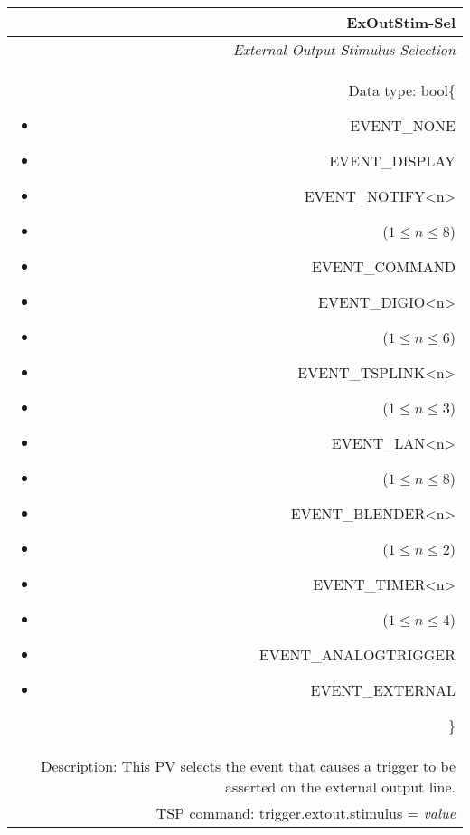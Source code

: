 \documentclass[openany]{article}
\begin{document}
		\begin{tabular}{N}
			\hline
			\bfseries ExOutStim-Sel\label{pv:exoutstim-sel} \\ \hline
			\emph{External Output Stimulus Selection} \\
			Data type: bool\{\begin{itemize}[noitemsep]
				\small
				\item[] EVENT\_NONE
				\item[] EVENT\_DISPLAY
				\item[] EVENT\_NOTIFY\textless n\textgreater
				\item[] ($1\leq n\leq 8$)
				\item[] EVENT\_COMMAND
				\item[] EVENT\_DIGIO\textless n\textgreater
				\item[] ($1\leq n\leq 6$)
				\item[] EVENT\_TSPLINK\textless n\textgreater
				\item[] ($1\leq n\leq 3$)
				\item[] EVENT\_LAN\textless n\textgreater
				\item[] ($1\leq n\leq 8$)
				\item[] EVENT\_BLENDER\textless n\textgreater 
				\item[] ($1\leq n\leq 2$)
				\item[] EVENT\_TIMER\textless n\textgreater
				\item[] ($1\leq n\leq 4$)
				\item[] EVENT\_ANALOGTRIGGER
				\item[] EVENT\_EXTERNAL
			\end{itemize}\} \\
			Description: This PV selects the event that causes a trigger to be asserted on the external output line. \\
			TSP command: trigger.extout.stimulus = \emph{value}
		\end{tabular}
\end{document}
